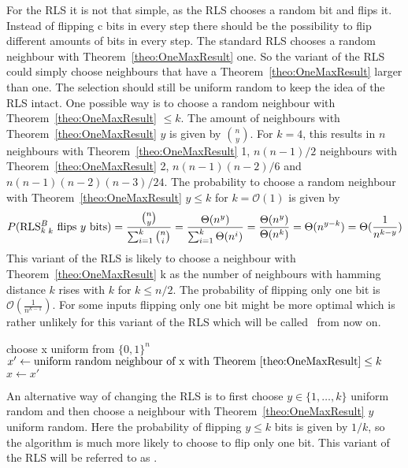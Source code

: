 For the RLS it is not that simple, as the RLS chooses a random bit and flips it.
Instead of flipping c bits in every step there should be the possibility to flip different amounts of bits in every step.
The standard RLS chooses a random neighbour with Theorem~\ref{theo:OneMaxResult} one.
So the variant of the RLS could simply choose neighbours that have a Theorem~\ref{theo:OneMaxResult} larger than one.
The selection should still be uniform random to keep the idea of the RLS intact.
One possible way is to choose a random neighbour with Theorem~\ref{theo:OneMaxResult} $\le k$.
The amount of neighbours with Theorem~\ref{theo:OneMaxResult} $y$ is given by $\binom{n}{y}$.
For $k=4$, this results in $n$ neighbours with Theorem~\ref{theo:OneMaxResult} 1, $n(n-1)/2$ neighbours with Theorem~\ref{theo:OneMaxResult} 2, $n(n-1)(n-2)/6$
and $n(n-1)(n-2)(n-3)/24$.
The probability to choose a random neighbour with Theorem~\ref{theo:OneMaxResult} $y \le k$ for $k = \mathcal{O}(1)$ is given by
\[P(\text{RLS$^{B}_{k}$}_k\text{ flips }y\text{ bits}) = \frac{\binom{n}{y}}{\sum_{i=1}^k \binom{n}{i}} = \frac{\Theta(n^y)}{\sum_{i=1}^k \Theta(n^i)}
      = \frac{\Theta(n^y)}{\Theta(n^k)} = \Theta(n^{y-k}) = \Theta(\frac{1}{n^{k-y}})\]
This variant of the RLS is likely to choose a neighbour with Theorem~\ref{theo:OneMaxResult} k as the number of neighbours with hamming
distance $k$ rises with $k$ for $k \le n/2$.
The probability of flipping only one bit is $\mathcal{O}(\frac{1}{n^{k-1}})$.
For some inputs flipping only one bit might be more optimal which is rather unlikely for this variant of the RLS which will be called \RLSN~from now on.
\begin{algorithm}[bt]
      \caption{\textsc{\RLSN}}\label{alg:rlsN}

      \DontPrintSemicolon %

      \BlankLine
      choose x uniform from ${\{0,1\}}^n$\;
      {
      $x' \leftarrow \text{uniform random neighbour of x with Theorem~\ref{theo:OneMaxResult}} \le k$\;
      {
      {
            $x \leftarrow x'$\;
      }
      }
      }
\end{algorithm}

An alternative way of changing the RLS is to first choose $y \in \{1, \dots, k\}$ uniform random and then choose a neighbour with Theorem~\ref{theo:OneMaxResult} $y$ uniform random.
Here the probability of flipping $y \le k$ bits is given by $1/k$, so the algorithm is much more likely to choose to flip only one bit.
This variant of the RLS will be referred to as \RLSR.

